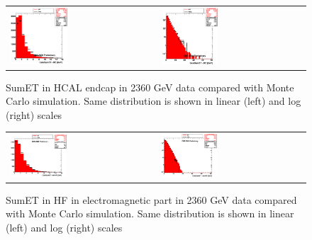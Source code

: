 \begin{figure}[h!]
 \centering
 \begin{tabular}{ll}
  \includegraphics[width=0.40\textwidth]{plots_DataVsMC_MB_2360GeV/h_caloSumetHE_lin.eps} &
  \includegraphics[width=0.40\textwidth]{plots_DataVsMC_MB_2360GeV/h_caloSumetHE.eps} \\
 \end{tabular}
 \caption{SumET in HCAL endcap in 2360 GeV data compared
   with Monte Carlo simulation. Same distribution is shown in linear (left) and log (right) scales
          \label{fig:DataVsMC_MB_2360_8}}
\end{figure}

\begin{figure}[h!]
 \centering
 \begin{tabular}{ll}
  \includegraphics[width=0.40\textwidth]{plots_DataVsMC_MB_2360GeV/h_caloSumetEmHF_lin.eps} &
  \includegraphics[width=0.40\textwidth]{plots_DataVsMC_MB_2360GeV/h_caloSumetEmHF.eps} \\
 \end{tabular}
 \caption{SumET in HF in electromagnetic part in 2360 GeV data compared
   with Monte Carlo simulation. Same distribution is shown in linear (left) and log (right) scales
          \label{fig:DataVsMC_MB_2360_9}}
\end{figure}

